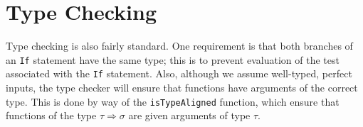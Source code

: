 \documentclass{amsart}
\begin{document}
\section{Type Checking}
Type checking is also fairly standard.  One requirement is that both branches of an \texttt{If} statement have the same type; this is to prevent evaluation of the test associated with the \texttt{If} statement.  Also, although we assume well-typed, perfect inputs, the type checker will ensure that functions have arguments of the correct type.  This is done by way of the \texttt{isTypeAligned} function, which ensure that functions of the type $\tau \Rightarrow \sigma$ are given arguments of type $\tau$.
\end{document}
